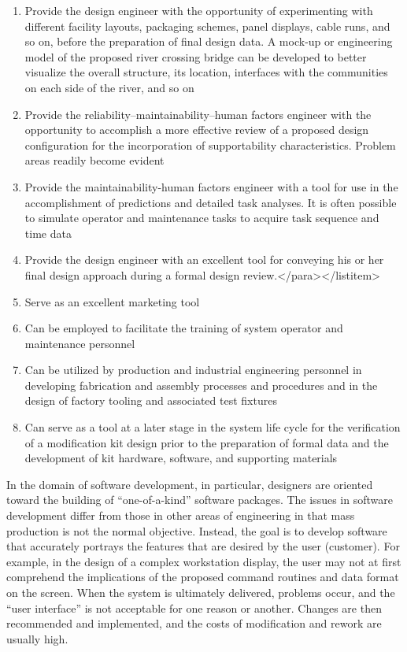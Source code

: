 \begin{enumerate}
\item Provide the design engineer with the opportunity of experimenting with different facility layouts, packaging schemes, panel displays, cable runs, and so on, before the preparation of final design data. A mock-up or engineering model of the proposed river crossing bridge can be developed to better visualize the overall structure, its location, interfaces with the communities on each side of the river, and so on
\item Provide the reliability–maintainability–human factors engineer with the opportunity to accomplish a more effective review of a proposed design configuration for the incorporation of supportability characteristics. Problem areas readily become evident
\item Provide the maintainability-human factors engineer with a tool for use in the accomplishment of predictions and detailed task analyses. It is often possible to simulate operator and maintenance tasks to acquire task sequence and time data
\item Provide the design engineer with an excellent tool for conveying his or her final design approach during a formal design review.</para></listitem>
\item Serve as an excellent marketing tool
\item Can be employed to facilitate the training of system operator and maintenance personnel
\item Can be utilized by production and industrial engineering personnel in developing fabrication and assembly processes and procedures and in the design of factory tooling and associated test fixtures
\item Can serve as a tool at a later stage in the system life cycle for the verification of a modification kit design prior to the preparation of formal data and the development of kit hardware, software, and supporting materials
\end{enumerate}

In the domain of software development, in particular, designers are oriented toward the building of ``one-of-a-kind'' software packages. The issues in software development differ from those in other areas of engineering in that mass production is not the normal objective. Instead, the goal is to develop software that accurately portrays the features that are desired by the user (customer). For example, in the design of a complex workstation display, the user may not at first comprehend the implications of the proposed command routines and data format on the screen. When the system is ultimately delivered, problems occur, and the ``user interface'' is not acceptable for one reason or another. Changes are then recommended and implemented, and the costs of modification and rework are usually high.

